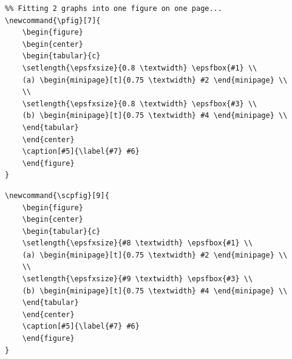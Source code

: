 \begin{verbatim}
%% Fitting 2 graphs into one figure on one page...
\newcommand{\pfig}[7]{
	\begin{figure}
	\begin{center}
	\begin{tabular}{c}
	\setlength{\epsfxsize}{0.8 \textwidth} \epsfbox{#1} \\
	(a) \begin{minipage}[t]{0.75 \textwidth} #2 \end{minipage} \\
	\\
	\setlength{\epsfxsize}{0.8 \textwidth} \epsfbox{#3} \\
	(b) \begin{minipage}[t]{0.75 \textwidth} #4 \end{minipage} \\
	\end{tabular}
	\end{center}
	\caption[#5]{\label{#7} #6}
	\end{figure}
}
\end{verbatim}

\begin{verbatim}
\newcommand{\scpfig}[9]{
	\begin{figure}
	\begin{center}
	\begin{tabular}{c}
	\setlength{\epsfxsize}{#8 \textwidth} \epsfbox{#1} \\
	(a) \begin{minipage}[t]{0.75 \textwidth} #2 \end{minipage} \\
	\\
	\setlength{\epsfxsize}{#9 \textwidth} \epsfbox{#3} \\
	(b) \begin{minipage}[t]{0.75 \textwidth} #4 \end{minipage} \\
	\end{tabular}
	\end{center}
	\caption[#5]{\label{#7} #6}
	\end{figure}
}
\end{verbatim}

